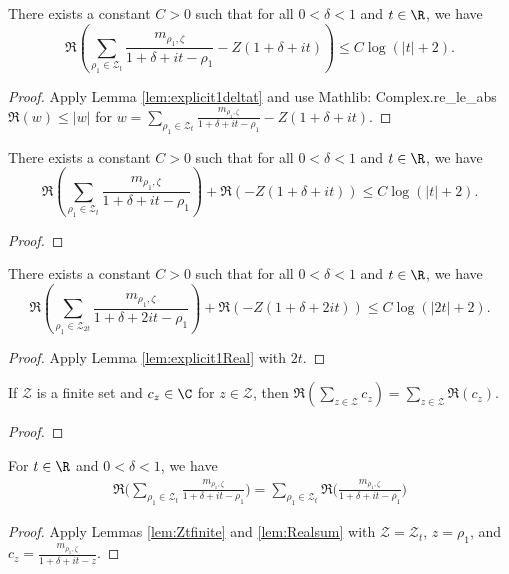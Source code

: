 \begin{lemma}\label{lem:explicit1Real} \leanok
There exists a constant $C>0$ such that for all $0<\delta<1$ and $t\in\R$, we have
\[ \Re\left(\sum_{\rho_1\in \mathcal Z_t} \frac{m_{\rho_1,\zeta}}{1+\delta+it-\rho_1} - Z(1+\delta+it)\right) \le C\log(|t|+2).\]
\end{lemma}
\begin{proof}  \leanok
Apply Lemma \ref{lem:explicit1deltat} and use Mathlib: Complex.re\_le\_abs
$\Re(w) \le |w|$ for $w=\sum_{\rho_1\in \mathcal Z_t} \frac{m_{\rho_1,\zeta}}{1+\delta+it-\rho_1} - Z(1+\delta+it)$.
\end{proof}

\begin{lemma}\label{lem:explicit1RealReal}  \leanok
There exists a constant $C>0$ such that for all $0<\delta<1$ and $t\in\R$, we have
\[ \Re\left(\sum_{\rho_1\in \mathcal Z_t} \frac{m_{\rho_1,\zeta}}{1+\delta+it-\rho_1}\right) + \Re\left(- Z(1+\delta+it)\right) \le C\log(|t|+2).\]
\end{lemma}
\begin{proof}  \leanok
\end{proof}

\begin{lemma}\label{lem:explicit2Real}  \leanok
There exists a constant $C>0$ such that for all $0<\delta<1$ and $t\in\R$, we have
\[ \Re\left(\sum_{\rho_1\in \mathcal Z_{2t}} \frac{m_{\rho_1,\zeta}}{1+\delta+2it-\rho_1}\right) + \Re\left(-Z(1+\delta+2it)\right) \le C\log(|2t|+2).\]
\end{lemma}
\begin{proof}
\leanok
Apply Lemma \ref{lem:explicit1Real} with $2t$.
\end{proof}

\begin{lemma}\label{lem:Realsum}  \leanok
If $\mathcal Z$ is a finite set and $c_z\in\C$ for $z\in\mathcal Z$, then $\Re(\sum_{z\in \mathcal Z}c_{z}) = \sum_{z\in \mathcal Z} \Re(c_{z})$.
\end{lemma}
\begin{proof} \leanok
\end{proof}

\begin{lemma}\label{lem:sumrho1}  \leanok
For $t\in\R$ and $0<\delta<1$, we have
\begin{align*}
\Re\Big(\sum_{\rho_1\in \mathcal Z_t} \frac{m_{\rho_1,\zeta}}{1+\delta+it-\rho_1}\Big) = \sum_{\rho_1\in \mathcal Z_t} \Re\Big(\frac{m_{\rho_1,\zeta}}{1+\delta+it-\rho_1}\Big)
\end{align*}
\end{lemma}
\begin{proof}  \leanok
Apply Lemmas \ref{lem:Ztfinite} and \ref{lem:Realsum} with $\mathcal Z = \mathcal Z_t$, $z = \rho_1$, and $c_{z}=\frac{m_{\rho_1,\zeta}}{1+\delta+it-z}$.
\end{proof}

